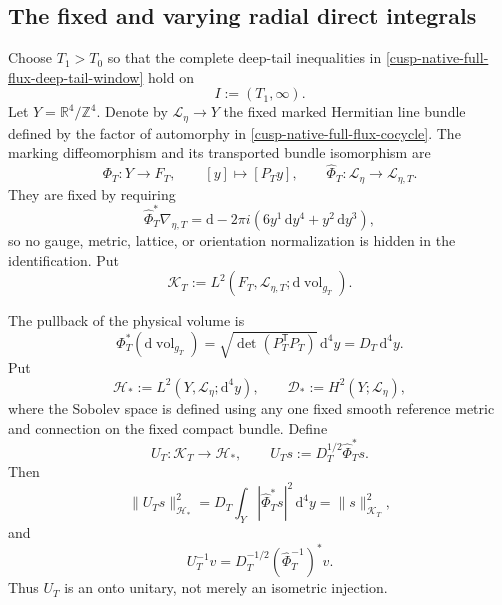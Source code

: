 
\subsection{The fixed and varying radial direct integrals}
\label{cusp-native-full-flux-radial-section}

Choose \(T_1>T_0\) so that the complete deep-tail inequalities in
\cref{cusp-native-full-flux-deep-tail-window} hold on
\[
 I:=(T_1,\infty).
\]
Let \(Y=\mathbb R^4/\mathbb Z^4\).  Denote by
\(\mathscr L_\eta\to Y\) the fixed marked Hermitian line bundle defined
by the factor of automorphy in
\cref{cusp-native-full-flux-cocycle}.  The marking diffeomorphism and its
transported bundle isomorphism are
\[
 \Phi_T:Y\longrightarrow F_T,\qquad [y]\longmapsto[P_Ty],
 \qquad
 \widehat\Phi_T:\mathscr L_\eta\longrightarrow\mathscr L_{\eta,T}.
\]
They are fixed by requiring
\[
 \widehat\Phi_T^*\nabla_{\eta,T}
 =\mathrm d-2\pi i(6y^1\,\mathrm dy^4+y^2\,\mathrm dy^3),
\]
so no gauge, metric, lattice, or orientation normalization is hidden in the
identification.  Put
\[
 \mathscr K_T
 :=L^2(F_T,\mathscr L_{\eta,T};
       \mathrm d\operatorname{vol}_{g_T}).
\]

The pullback of the physical volume is
\begin{equation}
 \Phi_T^*(\mathrm d\operatorname{vol}_{g_T})
 =\sqrt{\det(P_T^{\mathsf T}P_T)}\,\mathrm d^4y
 =D_T\,\mathrm d^4y.
\label{native-di-volume-pullback}
\end{equation}
Put
\[
 \mathscr H_*:=L^2(Y,\mathscr L_\eta;\mathrm d^4y),
 \qquad
 \mathscr D_*:=H^2(Y;\mathscr L_\eta),
\]
where the Sobolev space is defined using any one fixed smooth reference
metric and connection on the fixed compact bundle.  Define
\begin{equation}
 U_T:\mathscr K_T\longrightarrow\mathscr H_*,
 \qquad
 U_Ts:=D_T^{1/2}\widehat\Phi_T^*s.
\label{native-di-marking-unitary}
\end{equation}
Then
\[
 \|U_Ts\|_{\mathscr H_*}^2
 =D_T\int_Y|\widehat\Phi_T^*s|^2\,\mathrm d^4y
 =\|s\|_{\mathscr K_T}^2,
\]
and
\[
 U_T^{-1}v
 =D_T^{-1/2}(\widehat\Phi_T^{-1})^*v.
\]
Thus \(U_T\) is an onto unitary, not merely an isometric injection.

